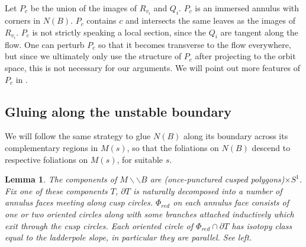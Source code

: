 \documentclass[12pt]{amsart}
\newtheorem{lemma}[thm]{Lemma}
\theoremstyle{definition}
\numberwithin{equation}{section}
\begin{document}
Let $P_c$ be the union of the images of $R_{v_i}$ and $Q_i$. $P_c$ is an immersed annulus with corners in $N(B)$. $P_c$ contains $c$ and intersects the same leaves as the images of $R_{v_i}$. $P_c$ is not strictly speaking a local section, since the $Q_i$ are tangent along the flow. One can perturb $P_c$ so that it becomes transverse to the flow everywhere, but since we ultimately only use the structure of $P_c$ after projecting to the orbit space, this is not necessary for our arguments. We will point out more features of $P_c$ in .

\subsection{Gluing along the unstable boundary} \label{subsec:unstableglue}

We will follow the same strategy to glue $N(B)$ along its boundary across its complementary regions in $M(s)$, so that the foliations on $N(B)$ descend to respective foliations on $M(s)$, for suitable $s$.

\begin{lemma} \label{lemma:unstableglue}
The components of $M \backslash \backslash B$ are (once-punctured cusped polygons)$\times S^1$. Fix one of these components $T$, $\partial T$ is naturally decomposed into a number of annulus faces meeting along cusp circles. $\Phi_{red}$ on each annulus face consists of one or two oriented circles along with some branches attached inductively which exit through the cusp circles. Each oriented circle of $\Phi_{red} \cap \partial T$ has isotopy class equal to the ladderpole slope, in particular they are parallel. See  left. 
\end{lemma}
\end{document}
